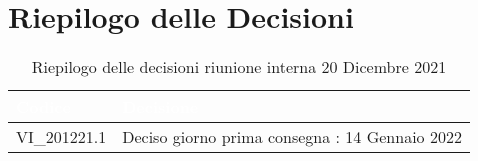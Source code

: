 \section{Riepilogo delle Decisioni}


\begin{table}[!htbp]
\renewcommand{\arraystretch}{1.5}
\begin{tabular}{m{}<{\centering}  m{}<{\centering}}
\rowcolor{darkblue} \textcolor{white}{\textbf{Codice}} & \textcolor{white}{\textbf{Decisione}} \\
\hline
VI\_201221.1 & Deciso giorno prima consegna : 14 Gennaio 2022\\
\end{tabular}
\caption{Riepilogo delle decisioni riunione interna 20 Dicembre 2021}
\end{table}